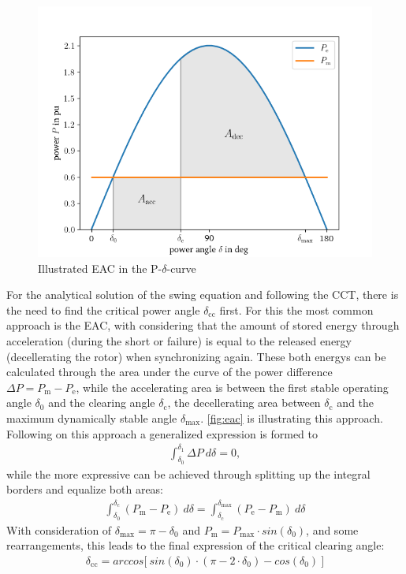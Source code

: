 \begin{figure}
        \centering
        \includegraphics[width=.6\textwidth]{python/plots/eac.png}
        \caption{Illustrated \acf{EAC} in the P-$\delta$-curve}
        \label{fig:eac}
\end{figure}
For the analytical solution of the swing equation and following the \acs{CCT}, there is the need to find the critical power angle $\delta_\mathrm{cc}$ first. For this the most common approach is the \acf{EAC}, with considering that the amount of stored energy through acceleration (during the short or failure) is equal to the released energy (decellerating the rotor) when synchronizing again. These both energys can be calculated through the area under the curve of the power difference $\Delta P=P_\mathrm{m}-P_\mathrm{e}$, while the accelerating area is between the first stable operating angle $\delta_\mathrm{0}$ and the clearing angle $\delta_\mathrm{c}$, the decellerating area between $\delta_\mathrm{c}$ and the maximum dynamically stable angle $\delta_\mathrm{max}$. \autoref{fig:eac} is illustrating this approach. Following on this approach a generalized expression is formed to
\begin{align}
        \int_{\delta_\mathrm{0}}^{\delta_\mathrm{1}}\Delta P~d\delta = 0 \label{eq:gen-eac},
\end{align}
while the more expressive can be achieved through splitting up the integral borders and equalize both areas:
\begin{align}
        \int_{\delta_\mathrm{0}}^{\delta_\mathrm{c}}(P_\mathrm{m}-P_\mathrm{e})~d\delta = \int_{\delta_\mathrm{c}}^{\delta_\mathrm{max}}(P_\mathrm{e}-P_\mathrm{m})~d\delta \label{eq:big-eac}
\end{align}
With consideration of $\delta_\mathrm{max}=\pi-\delta_\mathrm{0}$ and $P_\mathrm{m}=P_\mathrm{max} \cdot sin(\delta_\mathrm{0})$, and some rearrangements, this leads to the final expression of the critical clearing angle:
\begin{align}
        \delta_\mathrm{cc}=arccos\big[~sin(\delta_\mathrm{0}) \cdot (\pi-2 \cdot \delta_\mathrm{0})-cos(\delta_\mathrm{0})~\big] \label{eq:delta-cc}
\end{align}

